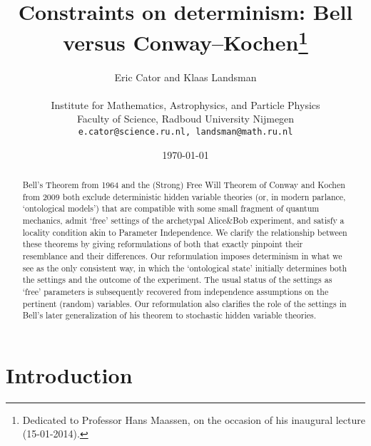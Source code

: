 \documentclass[11pt]{article}
\newcommand{\qm}{quantum mechanics}
\begin{document}
 
 \setlength{\unitlength}{1cm}\cleardoublepage
\thispagestyle{empty}
\title{Constraints on determinism: Bell versus Conway--Kochen\footnote{Dedicated to Professor Hans Maassen, on the occasion of his inaugural lecture (15-01-2014).}}
\author{Eric Cator and Klaas Landsman\\ \mbox{} \hfill \\
Institute for Mathematics, Astrophysics, and Particle Physics\\ Faculty of Science, Radboud University Nijmegen\\
\texttt{e.cator@science.ru.nl, landsman@math.ru.nl}}
\date{\today}
\maketitle\vspace{-1cm}
 \begin{abstract} 
\noindent 
Bell's Theorem from 1964 and the (Strong) Free Will Theorem of Conway and Kochen from 2009 both exclude deterministic hidden variable theories (or, in modern parlance, `ontological models') 
that are compatible with some small fragment of \qm, admit `free' settings of the archetypal Alice\&Bob experiment, and satisfy a locality condition akin to Parameter Independence. We clarify the relationship between these theorems by giving reformulations 
of both that exactly pinpoint their resemblance and their differences.  Our reformulation imposes  determinism in what we see as the only  consistent way, in which the `ontological state'  initially determines both the settings and the outcome of the experiment. The usual status of the settings as `free' parameters is subsequently  recovered from  independence assumptions on the pertinent (random) variables. Our reformulation also clarifies the role of the settings in 
Bell's later generalization of his theorem to stochastic hidden variable theories.

\end{abstract}
\maketitle
\section{Introduction}
\end{document}
